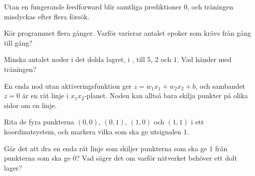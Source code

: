 \begin{aside}
\note[Obs] Utan en fungerande feedforward blir samtliga prediktioner $0$, och träningen misslyckas
efter flera försök.
\end{aside}

\begin{parts}
  \item Kör programmet flera gånger. Varför varierar antalet epoker som krävs från gång till gång?
  \item Minska antalet noder i det dolda lagret,  i , till $5$,
    $2$ och $1$. Vad händer med träningen?
\end{parts}

En enda nod utan aktiveringsfunktion ger $z = w_1 x_1 + w_2 x_2 + b$, och sambandet $z = 0$ är en
rät linje i $x_1 x_2$-planet. Noden kan alltså bara skilja punkter på olika sidor om en linje.
\begin{parts}
  \item Rita de fyra punkterna $(0, 0)$, $(0, 1)$, $(1, 0)$ och $(1, 1)$ i ett koordinatsystem, och
    markera vilka som ska ge utsignalen $1$.
  \item Går det att dra en enda rät linje som skiljer punkterna som ska ge $1$ från punkterna som
    ska ge $0$? Vad säger det om varför nätverket behöver ett dolt lager?
\end{parts}
